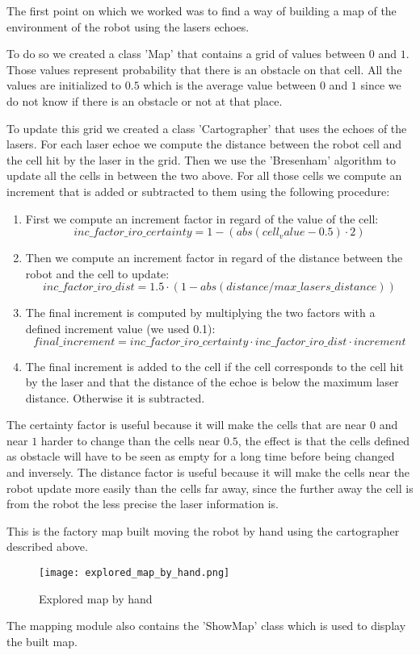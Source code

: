 The first point on which we worked was to find a way of building a map of the environment of the robot using the lasers echoes.

To do so we created a class 'Map' that contains a grid of values between $0$ and $1$.
Those values represent probability that there is an obstacle on that cell.
All the values are initialized to $0.5$ which is the average value between $0$ and $1$ since we do not know if there is an obstacle or not at that place.

To update this grid we created a class 'Cartographer' that uses the echoes of the lasers.
For each laser echoe we compute the distance between the robot cell and the cell hit by the laser in the grid.
Then we use the 'Bresenham' algorithm to update all the cells in between the two above.
For all those cells we compute an increment that is added or subtracted to them using the following procedure:

\begin{enumerate}
    \item First we compute an increment factor in regard of the value of the cell:
        $$
        inc\_factor\_iro\_certainty = 1 - (abs(cell_value - 0.5) \cdot 2)
        $$
    \item Then we compute an increment factor in regard of the distance between the robot and the cell to update:
        $$
        inc\_factor\_iro\_dist = 1.5 \cdot (1 - abs(distance / max\_lasers\_distance))
        $$
    \item The final increment is computed by multiplying the two factors with a defined increment value (we used 0.1):
        $$
        final\_increment = inc\_factor\_iro\_certainty \cdot inc\_factor\_iro\_dist \cdot increment
        $$
    \item The final increment is added to the cell if the cell corresponds to the cell hit by the laser and that the distance of the echoe is below the maximum laser distance.
        Otherwise it is subtracted.
\end{enumerate}

The certainty factor is useful because it will make the cells that are near $0$ and near $1$ harder to change than the cells near $0.5$, the effect is that the cells defined as obstacle will have to be seen as empty for a long time before being changed and inversely.
The distance factor is useful because it will make the cells near the robot update more easily than the cells far away, since the further away the cell is from the robot the less precise the laser information is.

This is the factory map built moving the robot by hand using the cartographer described above.

\FloatBarrier
\begin{figure}
    \centering\texttt{[image: explored\_map\_by\_hand.png]}
    \label{fig:explored_map_by_hand}
    \caption{Explored map by hand}
\end{figure}
\FloatBarrier

The mapping module also contains the 'ShowMap' class which is used to display the built map.

